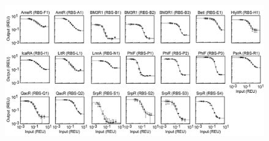 \documentclass[11pt]{article}
\begin{document}
\begin{figure}[ht!]
\centering
\includegraphics[width=16cm,height=17cm,keepaspectratio]{gate_response_functions.png}
\label{Case exmaple}
\end{figure}
\end{document}
